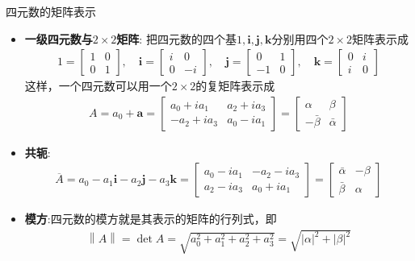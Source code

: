 \documentclass[UTF8,AutoFakeBold,AutoFakeSlant]{beamer}
\begin{document}
\begin{frame}{四元数的矩阵表示}
    \begin{itemize}
        \scriptsize
        \item \textbf{一级四元数与$2\times 2$矩阵}: 把四元数的四个基$1,\mathbf{i},\mathbf{j},\mathbf{k}$分别用四个$2\times 2$矩阵表示成
              \begin{align*}
                  1=\begin{bmatrix} 1 & 0\\ 0 & 1\end{bmatrix}, \quad\mathbf{i}=\begin{bmatrix} i & 0\\ 0 & -i\end{bmatrix},\quad\mathbf{j}=\begin{bmatrix} 0 & 1\\ -1 & 0\end{bmatrix},\quad\mathbf{k}=\begin{bmatrix} 0 & i\\ i & 0\end{bmatrix}
              \end{align*}
              这样，一个四元数可以用一个$2\times 2$的复矩阵表示成
              \begin{align*}
                  A=a_0+\mathbf{a}=\begin{bmatrix} a_0+ia_1 & a_2+ia_3\\ -a_2+ia_3 & a_0-ia_1\end{bmatrix}=\begin{bmatrix} \alpha & \beta\\ -\bar{\beta} & \bar{\alpha}\end{bmatrix}
              \end{align*}
        \item \textbf{共轭}:
              \begin{align*}
                  \overline{A}=a_0-a_1\mathbf{i}-a_2\mathbf{j}-a_3\mathbf{k}=\begin{bmatrix} a_0-ia_1 & -a_2-ia_3\\ a_2-ia_3 & a_0+ia_1\end{bmatrix}=\begin{bmatrix} \bar{\alpha} & -\beta\\ \bar{\beta} & \alpha\end{bmatrix}
              \end{align*}
        \item \textbf{模方}:四元数的模方就是其表示的矩阵的行列式，即
              \begin{align*}
                  \left\|A\right\|=\det A=\sqrt{a_0^2+a_1^2+a_2^2+a_3^2}=\sqrt{\left|\alpha\right|^2+\left|\beta\right|^2}
              \end{align*}

    \end{itemize}
\end{frame}
\end{document}
